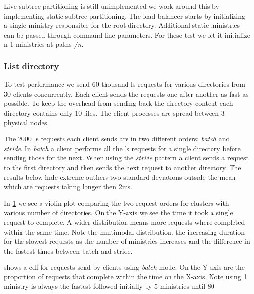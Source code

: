 Live subtree partitioning is still unimplemented we work around this by implementing static subtree partitioning. The load balancer starts by initializing a single ministry responsible for the root directory. Additional static ministries can be passed through command line parameters. For these test we let it initialize n-1 ministries at paths \textsl{/n}.

\subsubsection{List directory}
To test performance we send 60 thousand ls requests for various directories from 30 clients concurrently. Each client sends the requests one after another as fast as possible. To keep the overhead from sending back the directory content each directory contains only 10 files. The client processes are spread between 3 physical nodes. 

The 2000 ls requests each client sends are in two different orders: \textit{batch} and \textit{stride}. In \textit{batch} a client performs all the ls requests for a single directory before sending those for the next. When using the \textit{stride} pattern a client sends a request to the first directory and then sends the next request to another directory. The results below hide extreme outliers two standard deviations outside the mean which are requests taking longer then 2ms.

In \cref{fig:ls_vs_ministries} we see a violin plot comparing the two request orders for clusters with various number of directories. On the Y-axis we see the time it took a single request to complete. A wider distribution means more requests where completed within the same time. Note the multimodal distribution, the increasing duration for the slowest requests as the number of ministries increases and the difference in the fastest times between batch and stride.

 shows a \ac{cdf} for requests send by clients using \textit{batch} mode. On the Y-axis are the proportion of requests that complete within the time on the X-axis. Note using 1 ministry is always the fastest followed initially by 5 ministries until 80%

\begin{figure}[htbp]
	\centering
	
	\caption{}
	\label{fig:ls_vs_ministries}
\end{figure}%

